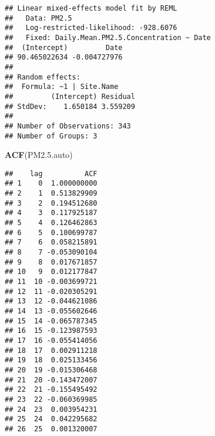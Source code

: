 \documentclass[]{article}
\newenvironment{Shaded}{\begin{snugshade}}{\end{snugshade}}
\newcommand{\KeywordTok}[1]{\textcolor[rgb]{0.13,0.29,0.53}{\textbf{#1}}}
\newcommand{\DataTypeTok}[1]{\textcolor[rgb]{0.13,0.29,0.53}{#1}}
\newcommand{\DecValTok}[1]{\textcolor[rgb]{0.00,0.00,0.81}{#1}}
\newcommand{\FloatTok}[1]{\textcolor[rgb]{0.00,0.00,0.81}{#1}}
\newcommand{\StringTok}[1]{\textcolor[rgb]{0.31,0.60,0.02}{#1}}
\newcommand{\CommentTok}[1]{\textcolor[rgb]{0.56,0.35,0.01}{\textit{#1}}}
\newcommand{\OperatorTok}[1]{\textcolor[rgb]{0.81,0.36,0.00}{\textbf{#1}}}
\newcommand{\NormalTok}[1]{#1}
\begin{document}
\begin{Shaded}
\end{Shaded}

\begin{verbatim}
## Linear mixed-effects model fit by REML
##   Data: PM2.5 
##   Log-restricted-likelihood: -928.6076
##   Fixed: Daily.Mean.PM2.5.Concentration ~ Date 
##  (Intercept)         Date 
## 90.465022634 -0.004727976 
## 
## Random effects:
##  Formula: ~1 | Site.Name
##         (Intercept) Residual
## StdDev:    1.650184 3.559209
## 
## Number of Observations: 343
## Number of Groups: 3
\end{verbatim}

\begin{Shaded}
\begin{Highlighting}[]
\KeywordTok{ACF}\NormalTok{(PM2.}\FloatTok{5.}\NormalTok{auto)}
\end{Highlighting}
\end{Shaded}

\begin{verbatim}
##    lag          ACF
## 1    0  1.000000000
## 2    1  0.513829909
## 3    2  0.194512680
## 4    3  0.117925187
## 5    4  0.126462863
## 6    5  0.100699787
## 7    6  0.058215891
## 8    7 -0.053090104
## 9    8  0.017671857
## 10   9  0.012177847
## 11  10 -0.003699721
## 12  11 -0.020305291
## 13  12 -0.044621086
## 14  13 -0.055602646
## 15  14 -0.065787345
## 16  15 -0.123987593
## 17  16 -0.055414056
## 18  17  0.002911218
## 19  18  0.025133456
## 20  19 -0.015306468
## 21  20 -0.143472007
## 22  21 -0.155495492
## 23  22 -0.060369985
## 24  23  0.003954231
## 25  24  0.042295682
## 26  25  0.001320007
\end{verbatim}
\end{document}
